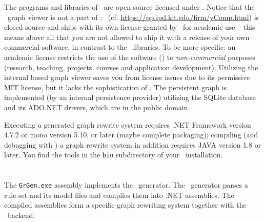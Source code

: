 
The programs and libraries of \GrG\ are open source licensed under \cite{LGPL3}.
Notice that the \yComp\ graph viewer is not a part of \GrG ; \yComp\ (cf. \url{https://pp.ipd.kit.edu/firm/yComp.html}) is closed source and ships with its own license granted by \yFiles\ for academic use --
this means above all that you are not allowed to ship it with a release of your own commercial software, in contrast to the \GrG\ libraries.
To be more specific: an academic license restricts the use of the software (\yComp) to \emph{non-commercial} purposes (research, teaching, projects, courses and application development).
Utilizing the internal \MSAGL{} based graph viewer saves you from license issues due to its permissive MIT license, but it lacks the sophistication of \yComp{}.
The persistent graph is implemented (by an internal persistence provider) utilizing the SQLite database and its ADO.NET drivers, which are in the public domain.

Executing a generated graph rewrite system requires .NET Framework\cite{NET} version 4.7.2 or mono\cite{MONO} version 5.10, or later (maybe complete packaging); compiling (and debugging with \yComp) a graph rewrite system in addition requires JAVA\cite{JAVA} version 1.8 or later. 
You find the tools in the \texttt{bin} subdirectory of your \GrG\ installation.

\section{\texttt{}} \label{grgenoptions}

\noindent The \texttt{GrGen.exe} assembly implements the \GrG\ generator.
The \GrG\ generator parses a rule set and its model files and compiles them into .NET assemblies.
The compiled assemblies form a specific graph rewriting system together with the \GrG\ backend.

